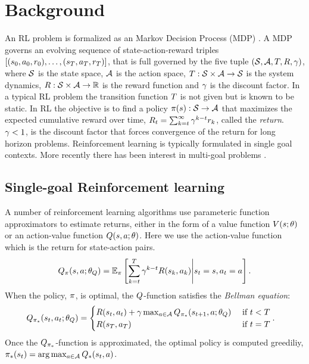 \section{Background}

An RL problem is formalized as an Markov Decision Process (MDP)
\citep{sutton1998reinforcement}. A MDP governs
an evolving sequence of state-action-reward triples $[(s_0, a_0,
r_0), \dots, (s_T, a_T, r_T)]$, that is full governed
by the five tuple $(\mathcal{S}, \mathcal{A}, T, R, \gamma)$, where $\mathcal{S}$ is the
state space, $\mathcal{A}$ is the action space, $T : \mathcal{S} \times \mathcal{A}
\rightarrow \mathcal{S}$ is the system dynamics, $R : \mathcal{S} \times \mathcal{A}
\rightarrow \mathbb{R} $ is the reward function and $\gamma$ is the discount
factor.
In a typical RL problem the transition function $T$ is not given but is
known to be static.
In RL the objective is to find a policy $\pi(s): \mathcal{S}
\rightarrow \mathcal{A}$ that
maximizes the expected cumulative
reward over time, $R_t = \sum_{k=t}^{\infty} \gamma^{k-t}r_{k}$, called the
\emph{return}. $\gamma < 1$, is the discount factor that forces
convergence of the return for long horizon problems. 
Reinforcement learning is typically formulated in single goal
contexts. More recently there has been interest in multi-goal
problems
\citep{andrychowicz2017hindsight,pong2018temporal,plappert2018multi}.


\subsection{Single-goal Reinforcement learning}

A number of reinforcement learning algorithms use parameteric function
approximators to estimate returns, either in the form of a value function
$V(s; \theta)$ or an action-value function $Q(s, a; \theta)$.
Here we use the action-value function which is the return for
state-action pairs.  
%
\begin{align}
Q_\pi(s, a; \theta_Q) = \mathbb{E}_\pi\left[ \sum_{k=t}^T
  \gamma^{k-t} R(s_k, a_k)
  \middle| s_t = s, a_t = a \right] .
  \label{eq:q-def}
\end{align}%
%
When the policy, $\pi$, is optimal, the $Q$-function satisfies the
\emph{Bellman equation}:
%
\begin{align}
    Q_{\pi_*}(s_t, a_t; \theta_Q)
  &=
    \begin{cases}
        R(s_t, a_t) + \gamma \max_{a \in \mathcal{A}}
        Q_{\pi_*}(s_{t+1}, a; \theta_Q)
      & \text{ if } t < T
      \\
      R(s_T, a_T) & \text{ if } t = T
    \end{cases}.
  \label{eq:bellman}
\end{align}%
% 
Once the $Q_{\pi_*}$-function is approximated, the optimal policy is
computed greediliy, $\pi_*(s_t) = \arg \max_{a \in \mathcal{A}} Q_*(s_t, a)$.

